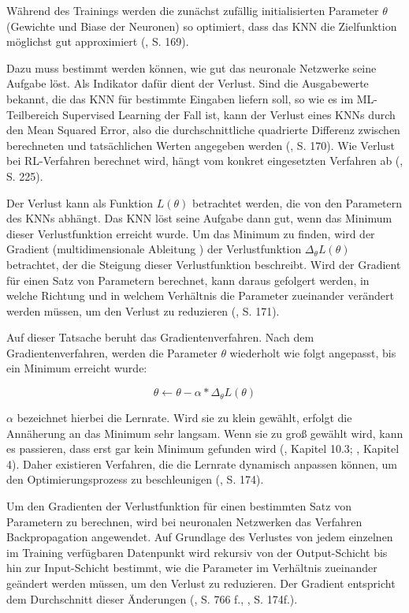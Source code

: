 Während des Trainings werden die zunächst zufällig initialisierten Parameter $\theta$ (Gewichte und Biase der Neuronen) so optimiert, dass das KNN die Zielfunktion möglichst gut approximiert (\cite{Albrecht.2024}, S. 169).

Dazu muss bestimmt werden können, wie gut das neuronale Netzwerke seine Aufgabe löst. Als Indikator dafür dient der Verlust. Sind die Ausgabewerte bekannt, die das KNN für bestimmte Eingaben liefern soll, so wie es im ML-Teilbereich Supervised Learning der Fall ist, kann der Verlust eines KNNs durch den Mean Squared Error, also die durchschnittliche quadrierte Differenz zwischen berechneten und tatsächlichen Werten angegeben werden (\cite{Albrecht.2024}, S. 170). Wie Verlust bei RL-Verfahren berechnet wird, hängt vom konkret eingesetzten Verfahren ab (\cite{Sutton.2018}, S. 225).

Der Verlust kann als Funktion $L(\theta)$ betrachtet werden, die von den Parametern des KNNs abhängt. Das KNN löst seine Aufgabe dann gut, wenn das Minimum dieser Verlustfunktion erreicht wurde. Um das Minimum zu finden, wird der Gradient (\glqq multidimensionale Ableitung \grqq{}) der Verlustfunktion $\Delta_\theta L(\theta)$ betrachtet, der die Steigung dieser Verlustfunktion beschreibt. Wird der Gradient für einen Satz von Parametern berechnet, kann daraus gefolgert werden, in welche Richtung und in welchem Verhältnis die Parameter zueinander verändert werden müssen, um den Verlust zu reduzieren (\cite{Albrecht.2024}, S. 171).

Auf dieser Tatsache beruht das Gradientenverfahren. Nach dem Gradientenverfahren, werden die Parameter $\theta$ wiederholt wie folgt angepasst, bis ein Minimum erreicht wurde:

\[ \theta \leftarrow \theta {-} \alpha * \Delta_\theta L(\theta) \]

$\alpha$ bezeichnet hierbei die Lernrate. Wird sie zu klein gewählt, erfolgt die Annäherung an das Minimum sehr langsam. Wenn sie zu groß gewählt wird, kann es passieren, dass erst gar kein Minimum gefunden wird (\cite{Ferguson.January2019}, Kapitel 10.3; \cite{Buduma.2022}, Kapitel 4). Daher existieren Verfahren, die die Lernrate dynamisch anpassen können, um den Optimierungsprozess zu beschleunigen (\cite{Albrecht.2024}, S. 174).

Um den Gradienten der Verlustfunktion für einen bestimmten Satz von Parametern zu berechnen, wird bei neuronalen Netzwerken das Verfahren Backpropagation angewendet. Auf Grundlage des Verlustes von jedem einzelnen im Training verfügbaren Datenpunkt wird rekursiv von der Output-Schicht bis hin zur Input-Schicht bestimmt, wie die Parameter im Verhältnis zueinander geändert werden müssen, um den Verlust zu reduzieren. Der Gradient entspricht dem Durchschnitt dieser Änderungen (\cite{Russell.2020}, S. 766 f., \cite{Albrecht.2024}, S. 174f.).

